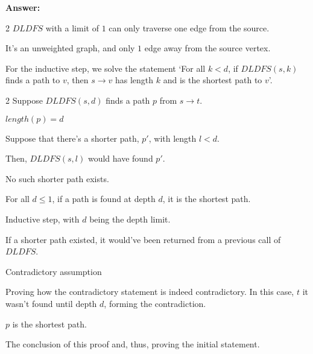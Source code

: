 \documentclass[11pt]{article}
\newenvironment{questions}
  {\begin{enumerate}}
  {\end{enumerate}}
\newenvironment{answer}
  {\vspace{0.5em}\noindent\textbf{Answer:}\par}
  {\vspace{1em}}
\newenvironment{answercols}
  {\begin{multicols}{2}}
  {\end{multicols}}
\begin{document}
\begin{questions}
\begin{answer}
\begin{answercols}
                $DLDFS$ with a limit of $1$ can only traverse one edge from the source.

                It's an unweighted graph, and only $1$ edge away from the source vertex.
            \end{answercols}

            For the inductive step, we solve the statement `For all $k<d$, if $DLDFS(s,k)$ finds a path to $v$, then $s \to v$ has length $k$ and is the shortest path to $v$'.

            \begin{answercols}
                Suppose $DLDFS(s,d)$ finds a path $p$ from $s \to t$.

                $length(p)=d$

                Suppose that there’s a shorter path, $p'$, with length $l<d$.

                Then, $DLDFS(s,l)$ would have found $p'$.

                No such shorter path exists.

                For all $d \leq 1$, if a path is found at depth $d$, it is the shortest path.

                \columnbreak

                Inductive step, with $d$ being the depth limit.

                If a shorter path existed, it would’ve been returned from a previous call of $DLDFS$.

                Contradictory assumption

                Proving how the contradictory statement is indeed contradictory. In this case, $t$ it wasn’t found until depth $d$, forming the contradiction.

                $p$ is the shortest path.

                The conclusion of this proof and, thus, proving the initial statement.
            \end{answercols}
        \end{answer}
    \end{questions}

    \pagebreak
\end{document}
